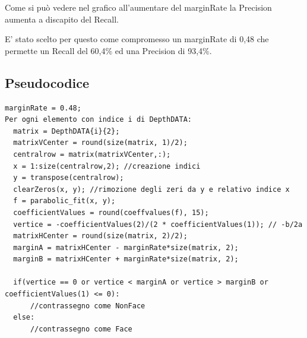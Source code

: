 \documentclass[
  italian,
]{article}
\begin{document}
\begin{figure}
\centering
{}%
\qquad
{}%
\end{figure}

Come si può vedere nel grafico all'aumentare del marginRate la Precision
aumenta a discapito del Recall.

E' stato scelto per questo come compromesso un marginRate di 0,48 che permette un Recall del 60,4\% ed una Precision di 93,4\%.

\pagebreak 

\hypertarget{pseudocodice}{%
\subsection{Pseudocodice}\label{pseudocodice}}

\begin{lstlisting}[basicstyle=\small]
marginRate = 0.48;
Per ogni elemento con indice i di DepthDATA:
  matrix = DepthDATA{i}{2}; 
  matrixVCenter = round(size(matrix, 1)/2);
  centralrow = matrix(matrixVCenter,:);
  x = 1:size(centralrow,2); //creazione indici
  y = transpose(centralrow);
  clearZeros(x, y); //rimozione degli zeri da y e relativo indice x
  f = parabolic_fit(x, y);
  coefficientValues = round(coeffvalues(f), 15);
  vertice = -coefficientValues(2)/(2 * coefficientValues(1)); // -b/2a
  matrixHCenter = round(size(matrix, 2)/2);
  marginA = matrixHCenter - marginRate*size(matrix, 2);
  marginB = matrixHCenter + marginRate*size(matrix, 2);
  
  if(vertice == 0 or vertice < marginA or vertice > marginB or coefficientValues(1) <= 0):
      //contrassegno come NonFace
  else:
      //contrassegno come Face
\end{lstlisting}
\end{document}
